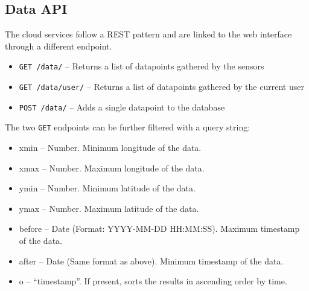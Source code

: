 \documentclass{sigchi}
\begin{document}
\subsection{Data API}
The cloud services follow a REST pattern and are linked to the web interface through a different endpoint.
\begin{itemize}
    \item \verb|GET /data/| -- Returns a list of datapoints gathered by the sensors
    \item \verb|GET /data/user/| -- Returns a list of datapoints gathered by the current user
    \item \verb|POST /data/| -- Adds a single datapoint to the database
\end{itemize}
The two \verb|GET| endpoints can be further filtered with a query string:
\begin{itemize}
    \item xmin -- Number.  Minimum longitude of the data.
    \item xmax -- Number.  Maximum longitude of the data.
    \item ymin -- Number.  Minimum latitude of the data.
    \item ymax -- Number.  Maximum latitude of the data.
    \item before -- Date (Format: YYYY-MM-DD HH:MM:SS).  Maximum timestamp of the data.
    \item after -- Date (Same format as above).  Minimum timestamp of the data.
    \item o -- ``timestamp''.  If present, sorts the results in ascending order by time.
\end{itemize}
\end{document}
